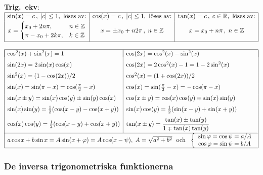 \documentclass{article}
\begin{document}
\medskip
\textbf{Trig.~ekv}:
\hbox{
$
\begin{array}[t]{|c|c|c|}
  \hline
  \sin(x)=c\,, \;|c|\leq 1,      \mbox{ löses av:} &
  \cos(x)=c\,, \;|c|\leq 1,      \mbox{ löses av:} &
  \tan(x)=c\,, \;c\in\mathbb{R}, \mbox{ löses av:}
\\[2pt]
x=
\begin{cases}
     x_0+2n\pi,   & n\in\mathbb{Z}\cr
    \pi-x_0+2k\pi,& k\in\mathbb{Z}
\end{cases}
&
x=\pm x_0+n2\pi\,,\;n\in\mathbb{Z}
&x=x_0+n\pi\,,\;n\in\mathbb{Z}
\\[11pt]
\hline
\end{array}
$} %

\medskip
$\begin{array}{|l|l|}\hline &\\*[-11pt] %
 \cos^2(x)+\sin^2(x)=1  &
 \cos(2x)=\cos^2(x)-\sin^2(x) \EndRow %
 \sin(2x)=2\sin(x)\cos(x)&\cos(2x)=2\cos^2(x)-1=1-2\sin^2(x) \EndRow
 \sin^2(x) = (1-\cos(2x))/2 &
 \cos^2(x) = (1+\cos(2x))/2 \EndRow %
 \sin(x)=\sin(\pi-x)=\cos(\frac{\pi}{2}-x) &
 \cos(x)=\sin(\frac{\pi}{2}-x)=-\cos(\pi-x)\EndRow
 \sin(x\pm y)=\sin(x)\cos(y)\pm\sin(y)\cos(x) &
 \cos(x\pm y)=\cos(x)\cos(y)\mp\sin(x)\sin(y)\EndRow
 \sin(x)\sin(y)=\frac{1}{2}(\cos(x-y)-\cos(x+y)) &
 \sin(x)\cos(y)=\frac{1}{2}(\sin(x-y)+\sin(x+y)) \EndRow
 \cos(x)\cos(y)=\frac{1}{2}(\cos(x-y)+\cos(x+y)) &
 \tan(x\pm y)=\dfrac{\tan(x)\pm\tan(y)}{1\mp\tan(x)\tan(y)}\\*[8pt]
 \cline{1-2}\multicolumn{2}{|c|}{     %
   a\cos x+b\sin x=A\sin(x+\varphi) = A\cos(x-\psi),\;
              A=\sqrt{a^2+b^2}
     \mbox{ \ och \ }
              \left\{ \begin{array}{l}
              \sin\varphi=\cos\psi=a/A \\
              \cos\varphi=\sin\psi=b/A
\end{array}\right.}
 \EndRow\hline\end{array}$ %


\subsubsection*{De inversa trigonometriska funktionerna}%
\end{document}
